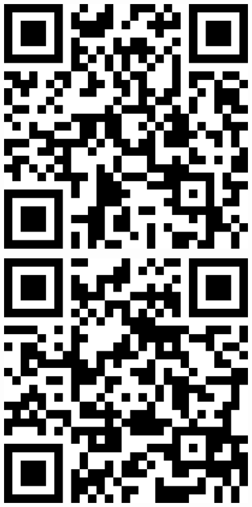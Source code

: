 \documentclass[letterpaper]{article}
\begin{document}
 \endgroup 
 \vspace*{\fill} 
 \pagebreak 
{} 
 \vspace*{\fill} 
 \begingroup 
 \centerline{\includegraphics[scale=1,width=5in,height=5in]{Room113.png}} 
 \endgroup 
 \vspace*{\fill} 
 \pagebreak 
{} 
 \vspace*{\fill} 
 \begingroup 
 \centerline{\includegraphics[scale=1,width=5in,height=5in]{Room3430.png}} 
\end{document}
